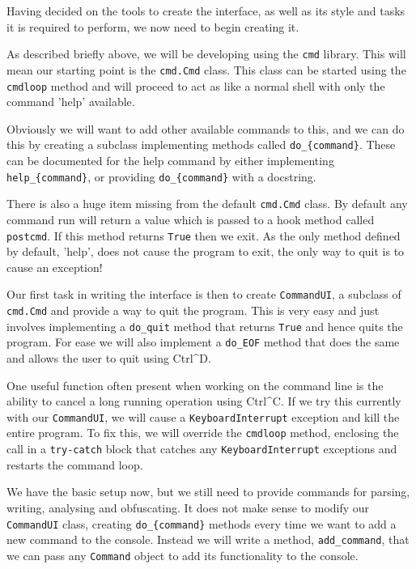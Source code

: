 \documentclass[twoside,a4paper]{report}
\begin{document}
Having decided on the tools to create the interface, as well as its style and tasks it is required to perform, we now need to begin creating it.

As described briefly above, we will be developing using the \texttt{cmd} library. This will mean our starting point is the \texttt{cmd.Cmd} class.
This class can be started using the \texttt{cmdloop} method and will proceed to act as like a normal shell with only the command 'help' available.

Obviously we will want to add other available commands to this, and we can do this by creating a subclass implementing methods called
\texttt{do\_\{command\}}. These can be documented for the help command by either implementing \texttt{help\_\{command\}}, or providing
\texttt{do\_\{command\}} with a docstring.

There is also a huge item missing from the default \texttt{cmd.Cmd} class. By default any command run will return a value which is passed to a
hook method called \texttt{postcmd}. If this method returns \texttt{True} then we exit. As the only method defined by default, 'help', does not
cause the program to exit, the only way to quit is to cause an exception!

Our first task in writing the interface is then to create \texttt{CommandUI}, a subclass of \texttt{cmd.Cmd} and provide a way to quit the program.
This is very easy and just involves implementing a \texttt{do\_quit} method that returns \texttt{True} and hence quits the program. For ease we will
also implement a \texttt{do\_EOF} method that does the same and allows the user to quit using Ctrl\^{}D.

One useful function often present when working on the command line is the ability to cancel a long running operation using Ctrl\^{}C. If we try this
currently with our \texttt{CommandUI}, we will cause a \texttt{KeyboardInterrupt} exception and kill the entire program. To fix this, we will
override the \texttt{cmdloop} method, enclosing the call in a \texttt{try-catch} block that catches any \texttt{KeyboardInterrupt} exceptions and
restarts the command loop.

We have the basic setup now, but we still need to provide commands for parsing, writing, analysing and obfuscating. It does not make sense to modify
our \texttt{CommandUI} class, creating \texttt{do\_\{command\}} methods every time we want to add a new command to the console. Instead we will write
a method, \texttt{add\_command}, that we can pass any \texttt{Command} object to add its functionality to the console.
\end{document}

